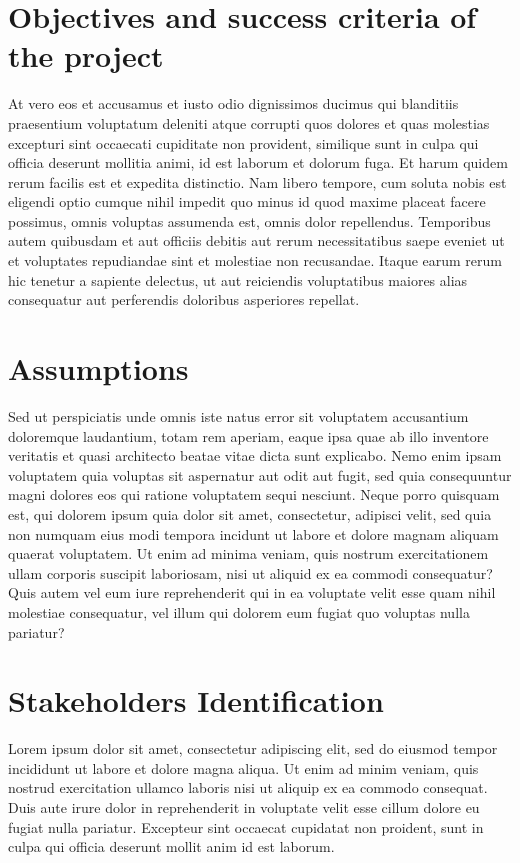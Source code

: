 \section{Objectives and success criteria of the project}
At vero eos et accusamus et iusto odio dignissimos ducimus qui blanditiis praesentium voluptatum deleniti atque corrupti 
quos dolores et quas molestias excepturi sint occaecati cupiditate non provident, similique sunt in culpa qui officia 
deserunt mollitia animi, id est laborum et dolorum fuga. Et harum quidem rerum facilis est et expedita distinctio. 
Nam libero tempore, cum soluta nobis est eligendi optio cumque nihil impedit quo minus id quod maxime placeat facere possimus, 
omnis voluptas assumenda est, omnis dolor repellendus. Temporibus autem quibusdam et aut officiis debitis aut rerum 
necessitatibus saepe eveniet ut et voluptates repudiandae sint et molestiae non recusandae. 
Itaque earum rerum hic tenetur a sapiente delectus, ut aut reiciendis voluptatibus maiores alias consequatur aut perferendis 
doloribus asperiores repellat.
\section{Assumptions}
Sed ut perspiciatis unde omnis iste natus error sit voluptatem accusantium doloremque laudantium, totam rem aperiam, 
eaque ipsa quae ab illo inventore veritatis et quasi architecto beatae vitae dicta sunt explicabo. 
Nemo enim ipsam voluptatem quia voluptas sit aspernatur aut odit aut fugit, sed quia consequuntur magni 
dolores eos qui ratione voluptatem sequi nesciunt. Neque porro quisquam est, qui dolorem ipsum quia dolor sit amet, 
consectetur, adipisci velit, sed quia non numquam eius modi tempora incidunt ut labore et dolore magnam aliquam quaerat voluptatem. 
Ut enim ad minima veniam, quis nostrum exercitationem ullam corporis suscipit laboriosam, nisi ut aliquid ex ea commodi consequatur? 
Quis autem vel eum iure reprehenderit qui in ea voluptate velit esse quam nihil molestiae consequatur, 
vel illum qui dolorem eum fugiat quo voluptas nulla pariatur?
\section{Stakeholders Identification}
Lorem ipsum dolor sit amet, consectetur adipiscing elit, sed do eiusmod tempor incididunt ut labore et dolore magna aliqua. 
Ut enim ad minim veniam, quis nostrud exercitation ullamco laboris nisi ut aliquip ex ea commodo consequat. 
Duis aute irure dolor in reprehenderit in voluptate velit esse cillum dolore eu fugiat nulla pariatur. 
Excepteur sint occaecat cupidatat non proident, sunt in culpa qui officia deserunt mollit anim id est laborum.

